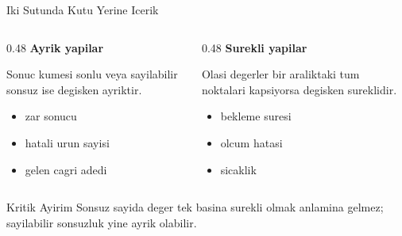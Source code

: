 
\begin{frame}[t]{Iki Sutunda Kutu Yerine Icerik}
\small
\begin{columns}[T,onlytextwidth]
    \begin{column}{0.48\textwidth}
        \textbf{Ayrik yapilar}

        \vspace{0.2cm}
        Sonuc kumesi sonlu veya sayilabilir sonsuz ise degisken ayriktir.

        \begin{itemize}
            \item zar sonucu
            \item hatali urun sayisi
            \item gelen cagri adedi
        \end{itemize}
    \end{column}
    \begin{column}{0.48\textwidth}
        \textbf{Surekli yapilar}

        \vspace{0.2cm}
        Olasi degerler bir araliktaki tum noktalari kapsiyorsa degisken sureklidir.

        \begin{itemize}
            \item bekleme suresi
            \item olcum hatasi
            \item sicaklik
        \end{itemize}
    \end{column}
\end{columns}

\vspace{0.25cm}
\begin{infoblock}{Kritik Ayirim}
    Sonsuz sayida deger tek basina surekli olmak anlamina gelmez; sayilabilir sonsuzluk yine ayrik olabilir.
\end{infoblock}
\end{frame}

